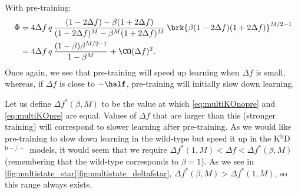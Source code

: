 \documentclass[10pt]{article}
\newcommand{\KO}{K$^\mathrm{b}$D$^{\mathrm{b}-/-}$}
\begin{document}
With pre-training:
%
\begin{equation}\label{eq:multiKOpre}
\begin{aligned}
  \Phi &= 4{\Delta f}\, q \, \frac{(1-2\Delta f) - \beta(1+2\Delta f)}
          {(1-2\Delta f)^M - \beta^M(1+2\Delta f)^M}   \,
          \brk{\beta (1-2\Delta f) (1+2\Delta f)}^{M/2-1} \\
       &= 4{\Delta f}\, q\,\frac{(1-\beta)\beta^{M/2-1}}{1-\beta^M} + \CO(\Delta f)^2.
\end{aligned}
\end{equation}
%
Once again, we see that pre-training will speed up learning when $\Delta f$ is small, whereas, if $\Delta f$ is close to $-\half$, pre-training will initially slow down learning.

Let us define $\Delta f^*(\beta,M)$ to be the value at which \eqref{eq:multiKOnopre} and \eqref{eq:multiKOpre} are equal.
Values of $\Delta f$ that are larger than this (stronger training) will correspond to slower learning after pre-training.
As we would like pre-training to slow down learning in the wild-type but speed it up in the \KO\ models, it would seem that we require $\Delta f^*(1,M) < \Delta f < \Delta f^*(\beta,M)$ (remembering that the wild-type corresponds to $\beta=1$).
As we see in \autoref{fig:multistate_star}\ref{fig:multistate_deltafstar}, $\Delta f^*(\beta,M) > \Delta f^*(1,M)$, so this range always exists.

\end{document}
